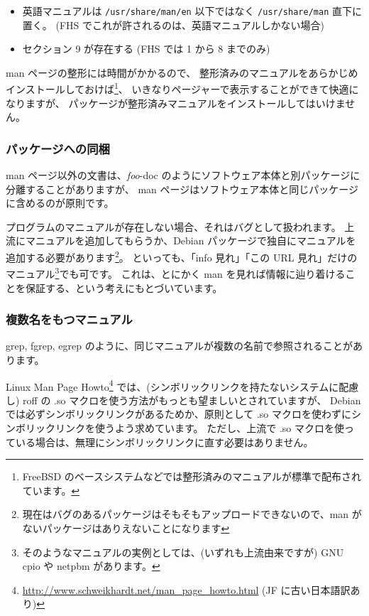 \documentclass[mingoth,a4paper]{jsarticle}
\begin{document}
\begin{itemize}
\item 英語マニュアルは {\tt /usr/share/man/en} 以下ではなく {\tt /usr/share/man} 直下に置く。
(FHS でこれが許されるのは、英語マニュアルしかない場合)
\item セクション 9 が存在する
(FHS では 1 から 8 までのみ)
\end{itemize}

man ページの整形には時間がかかるので、
整形済みのマニュアルをあらかじめインストールしておけば\footnote{FreeBSD のベースシステムなどでは整形済みのマニュアルが標準で配布されています。}、
いきなりページャーで表示することができて快適になりますが、
パッケージが整形済みマニュアルをインストールしてはいけません。

\subsubsection{パッケージへの同梱}
man ページ以外の文書は、{\it foo}-doc のようにソフトウェア本体と別パッケージに分離することがありますが、
man ページはソフトウェア本体と同じパッケージに含めるのが原則です。

プログラムのマニュアルが存在しない場合、それはバグとして扱われます。
上流にマニュアルを追加してもらうか、Debian パッケージで独自にマニュアルを追加する必要があります\footnote{現在はバグのあるパッケージはそもそもアップロードできないので、man がないパッケージはありえないことになります}。
といっても、「info 見れ」「この URL 見れ」だけのマニュアル\footnote{そのようなマニュアルの実例としては、(いずれも上流由来ですが) GNU cpio や netpbm があります。}でも可です。
これは、とにかく man を見れば情報に辿り着けることを保証する、という考えにもとづいています。

\subsubsection{複数名をもつマニュアル}

grep, fgrep, egrep のように、同じマニュアルが複数の名前で参照されることがあります。

Linux Man Page Howto\footnote{\url{ http://www.schweikhardt.net/man_page_howto.html} (JF に古い日本語訳あり)}
では、(シンボリックリンクを持たないシステムに配慮し) roff の .so マクロを使う方法がもっとも望ましいとされていますが、
Debian では必ずシンボリックリンクがあるためか、原則として .so マクロを使わずにシンボリックリンクを使うよう求めています。
ただし、上流で .so マクロを使っている場合は、無理にシンボリックリンクに直す必要はありません。
\end{document}
